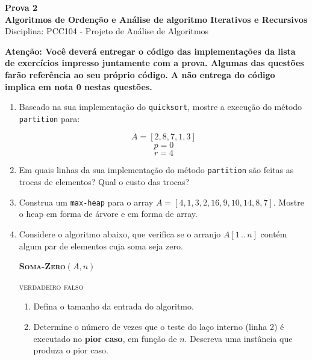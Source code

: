 \documentclass[9pt,a4paper]{extarticle}
\begin{document}
\begin{center}
  \Large \textbf{Prova 2 \\ Algoritmos de Ordenção e Análise de algoritmo Iterativos e Recursivos} \\[4pt]
  \normalsize Disciplina: PCC104 - Projeto de Análise de Algoritmos
\end{center}

\vspace{1cm}

\textbf{Atenção: Você deverá entregar o código das implementações da lista de exercícios impresso juntamente com a prova. Algumas das questões farão referência ao seu próprio código. A não entrega do código implica em nota 0 nestas questões.}

\begin{enumerate}
  \item Baseado na sua implementação do \texttt{quicksort}, mostre a execução do método \texttt{partition} para:
  
  \[A = [2,8,7,1,3]\]
  \[p = 0\]
  \[r = 4\]

  \item Em quais linhas da sua implementação do método \texttt{partition} são feitas as trocas de elementos? Qual o custo das trocas?
  
  \item Construa um \texttt{max-heap} para o array $A = [4,1,3,2,16,9,10,14,8,7]$. Mostre o heap em forma de árvore e em forma de array.
  
  \item Considere o algoritmo abaixo, que verifica se o arranjo $A[1\,..\,n]$ contém algum par de elementos cuja soma seja zero.

    \begin{center}
    \begin{minipage}{0.65\textwidth}
    \textbf{\textsc{Soma-Zero}}$(A, n)$
    \begin{algorithmic}[1]
                    \State \Return \textsc{verdadeiro}
                \EndIf
            \EndFor
        \EndFor
        \State \Return \textsc{falso}
    \end{algorithmic}
    \end{minipage}
    \end{center}

\begin{enumerate}[label=(\alph*)]
    \item Defina o tamanho da entrada do algoritmo.
    \item Determine o número de vezes que o teste do laço interno (linha 2) é executado no \textbf{pior caso}, em função de $n$. Descreva uma instância que produza o pior caso.


\end{enumerate}
\end{enumerate}
\end{document}
